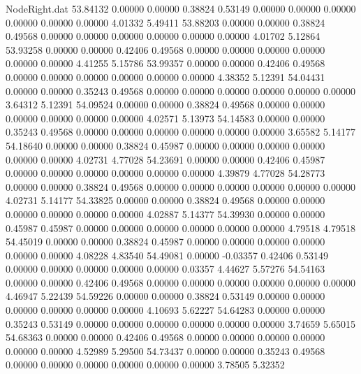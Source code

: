 \begin{filecontents}{NodeRight.dat}
  53.84132    0.00000    0.00000     0.38824    0.53149    0.00000    0.00000    0.00000    0.00000    0.00000    0.00000    4.01332    5.49411
  53.88203    0.00000    0.00000     0.38824    0.49568    0.00000    0.00000    0.00000    0.00000    0.00000    0.00000    4.01702    5.12864
  53.93258    0.00000    0.00000     0.42406    0.49568    0.00000    0.00000    0.00000    0.00000    0.00000    0.00000    4.41255    5.15786
  53.99357    0.00000    0.00000     0.42406    0.49568    0.00000    0.00000    0.00000    0.00000    0.00000    0.00000    4.38352    5.12391
  54.04431    0.00000    0.00000     0.35243    0.49568    0.00000    0.00000    0.00000    0.00000    0.00000    0.00000    3.64312    5.12391
  54.09524    0.00000    0.00000     0.38824    0.49568    0.00000    0.00000    0.00000    0.00000    0.00000    0.00000    4.02571    5.13973
  54.14583    0.00000    0.00000     0.35243    0.49568    0.00000    0.00000    0.00000    0.00000    0.00000    0.00000    3.65582    5.14177
  54.18640    0.00000    0.00000     0.38824    0.45987    0.00000    0.00000    0.00000    0.00000    0.00000    0.00000    4.02731    4.77028
  54.23691    0.00000    0.00000     0.42406    0.45987    0.00000    0.00000    0.00000    0.00000    0.00000    0.00000    4.39879    4.77028
  54.28773    0.00000    0.00000     0.38824    0.49568    0.00000    0.00000    0.00000    0.00000    0.00000    0.00000    4.02731    5.14177
  54.33825    0.00000    0.00000     0.38824    0.49568    0.00000    0.00000    0.00000    0.00000    0.00000    0.00000    4.02887    5.14377
  54.39930    0.00000    0.00000     0.45987    0.45987    0.00000    0.00000    0.00000    0.00000    0.00000    0.00000    4.79518    4.79518
  54.45019    0.00000    0.00000     0.38824    0.45987    0.00000    0.00000    0.00000    0.00000    0.00000    0.00000    4.08228    4.83540
  54.49081    0.00000   -0.03357     0.42406    0.53149    0.00000    0.00000    0.00000    0.00000    0.00000    0.03357    4.44627    5.57276
  54.54163    0.00000    0.00000     0.42406    0.49568    0.00000    0.00000    0.00000    0.00000    0.00000    0.00000    4.46947    5.22439
  54.59226    0.00000    0.00000     0.38824    0.53149    0.00000    0.00000    0.00000    0.00000    0.00000    0.00000    4.10693    5.62227
  54.64283    0.00000    0.00000     0.35243    0.53149    0.00000    0.00000    0.00000    0.00000    0.00000    0.00000    3.74659    5.65015
  54.68363    0.00000    0.00000     0.42406    0.49568    0.00000    0.00000    0.00000    0.00000    0.00000    0.00000    4.52989    5.29500
  54.73437    0.00000    0.00000     0.35243    0.49568    0.00000    0.00000    0.00000    0.00000    0.00000    0.00000    3.78505    5.32352

\end{filecontents}
